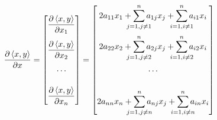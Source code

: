 \documentclass[notitlepage]{article}
\begin{document}
\begin{align*}
  \frac{\partial \left\langle x,y \right\rangle}{\partial x} = 
  \begin{bmatrix}
    \dfrac{\partial \left\langle x,y \right\rangle}{\partial x_1} \\[3ex]
    \dfrac{\partial \left\langle x,y \right\rangle}{\partial x_2} \\[3ex]
    \cdots \\[3ex]
    \dfrac{\partial \left\langle x,y \right\rangle}{\partial x_n} 
  \end{bmatrix}
  = 
  \begin{bmatrix}
    2 a_{11}x_1 + \displaystyle \sum_{\mathclap{j=1, j \neq 1}}^n a_{1j} x_j + \sum_{\mathclap{i=1, i \neq 1}}^n a_{i1} x_i \\[4ex]
    2 a_{22}x_2 + \displaystyle \sum_{\mathclap{j=1, j \neq 2}}^n a_{2j} x_j + \sum_{\mathclap{i=1, i \neq 2}}^n a_{i2} x_i \\[4ex]
    \cdots \\[4ex]
    2 a_{nn}x_n + \displaystyle \sum_{\mathclap{j=1, j \neq n}}^n a_{nj} x_j + \sum_{\mathclap{i=1, i \neq n}}^n a_{in} x_i \\
  \end{bmatrix}
\end{align*}
\end{document}
